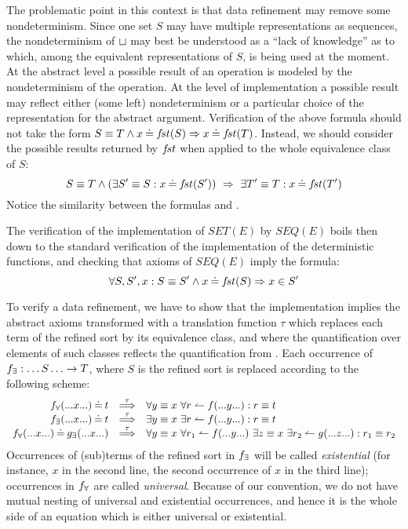 The problematic point in this context is that data refinement may remove some nondeterminism. Since one set $S$ may have multiple representations as sequences, the nondeterminism of $\sqcup$ may best be understood as a ``lack of knowledge'' as to which, among the equivalent representations of $S$, is being
used at the moment. At the abstract level a possible result of an operation is modeled by the nondeterminism of the operation. At the level of implementation a possible result may reflect either (some left) nondeterminism or a particular choice of the representation for the abstract argument.
Verification of the above formula should not take the form \(S\equiv T\land x\mathbin{\doteq} f\!st(S)\mathrel\Rightarrow x\mathbin{\doteq} f\!st(T)\). Instead, we should consider the
possible results returned by $f\!st$ when applied to the whole equivalence class
of $S$:
\begin{equation}\label{eq:seqcong}
S\equiv T\land (\exists S'\equiv S: x\mathbin{\doteq} f\!st(S'))\ \mathrel\Rightarrow\ \exists T'\equiv T : x\mathbin{\doteq} f\!st(T')
\end{equation}
Notice the similarity between the formulas  and .

The verification of the implementation of $SET(E)$ by $SEQ(E)$ boils then down to the standard verification of the implementation of the deterministic
functions, and checking that axioms of $SEQ(E)$ imply the formula: \[\forall S,S',x:S\equiv S'\land x\mathbin{\doteq} f\!st(S)\mathrel\Rightarrow x\in S'\] 

To verify a data refinement, we have to show that the implementation implies the
abstract
axioms transformed with a translation function $\tau$ which replaces 
each term of the refined sort by its equivalence class, and where the quantification over elements of such classes reflects the quantification from . Each occurrence of $f_\exists:\ldots S\ldots\rightarrow T$, where $S$ is the refined sort is replaced according to the following scheme:
\begin{equation}\label{eq:isverify}
\begin{array}{rcl}
\Bre f(...x...) \Eq t & \TTo{\tau} & \forall y\equiv x\ 
\forall r\isres f(...y...) : r\equiv t\\ \Bree f(...x...) \Eq t & \TTo{\tau} & \exists y\equiv x\ \exists r\isres f(...y...)
: r\equiv t \\
\Bre f(...x...) \Eq \Bree g(...x...) & \TTo{\tau} & \forall y\equiv x\ 
\forall r_1\isres f(...y...)\ \exists z\equiv x\ \exists r_2\isres g(...z...): r_1\equiv r_2 \end{array}
\end{equation}
Occurrences of (sub)terms of the refined sort in $f_\exists$ will be called {\em existential} (for instance, $x$ in the second line, the second occurrence of $x$ in the third line); occurrences in $f_\forall$ are called {\em universal}. Because of our convention, we do not have mutual nesting of universal and existential occurrences, and hence
it is the whole side of an equation which is either universal or existential. 

